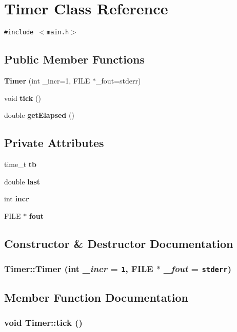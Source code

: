 \section{Timer Class Reference}
\label{classTimer}
{\tt \#include $<$main.h$>$}

\subsection*{Public Member Functions}
\begin{CompactItemize}
\item 
{\bf Timer} (int \_\-incr=1, FILE $\ast$\_\-fout=stderr)
\item 
void {\bf tick} ()
\item 
double {\bf getElapsed} ()
\end{CompactItemize}
\subsection*{Private Attributes}
\begin{CompactItemize}
\item 
time\_\-t {\bf tb}
\item 
double {\bf last}
\item 
int {\bf incr}
\item 
FILE $\ast$ {\bf fout}
\end{CompactItemize}


\subsection{Constructor \& Destructor Documentation}
\subsubsection{\setlength{\rightskip}{0pt plus 5cm}Timer::Timer (int {\em \_\-incr} = {\tt 1}, FILE $\ast$ {\em \_\-fout} = {\tt stderr})\hspace{0.3cm}{\tt  [inline]}}\label{classTimer_85dad19b57140a177e64a2b47a08bb3c}




\subsection{Member Function Documentation}
\subsubsection{\setlength{\rightskip}{0pt plus 5cm}void Timer::tick ()\hspace{0.3cm}{\tt  [inline]}}\label{classTimer_38076ccaf3684782b008dfeb9a1659e3}


